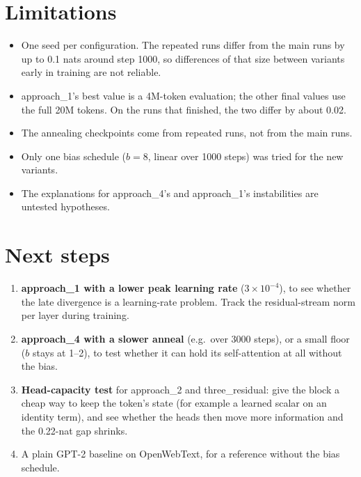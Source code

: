 \documentclass[11pt]{article}
\newcommand{\aone}{approach\_1}
\newcommand{\atwo}{approach\_2}
\newcommand{\afour}{approach\_4}
\newcommand{\tr}{three\_residual}
\begin{document}
\section{Limitations}
\begin{itemize}
\item One seed per configuration. The repeated runs differ from the main runs by up to 0.1 nats around step 1000,
so differences of that size between variants early in training are not reliable.
\item \aone{}'s best value is a 4M-token evaluation; the other final values use the full 20M tokens. On the runs
that finished, the two differ by about 0.02.
\item The annealing checkpoints come from repeated runs, not from the main runs.
\item Only one bias schedule ($b=8$, linear over 1000 steps) was tried for the new variants.
\item The explanations for \afour{}'s and \aone{}'s instabilities are untested hypotheses.
\end{itemize}

\section{Next steps}
\begin{enumerate}
\item \textbf{\aone{} with a lower peak learning rate} ($3\times10^{-4}$), to see whether the late divergence is
a learning-rate problem. Track the residual-stream norm per layer during training.
\item \textbf{\afour{} with a slower anneal} (e.g.\ over 3000 steps), or a small floor ($b$ stays at 1--2), to
test whether it can hold its self-attention at all without the bias.
\item \textbf{Head-capacity test} for \atwo{} and \tr{}: give the block a cheap way to keep the token's state
(for example a learned scalar on an identity term), and see whether the heads then move more information and
the 0.22-nat gap shrinks.
\item A plain GPT-2 baseline on OpenWebText, for a reference without the bias schedule.
\end{enumerate}
\end{document}
